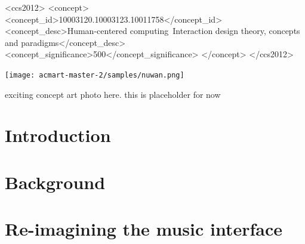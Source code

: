 \documentclass[acmtog]{acmart}
\begin{document}
\begin{CCSXML}
<ccs2012>
   <concept>
       <concept_id>10003120.10003123.10011758</concept_id>
       <concept_desc>Human-centered computing~Interaction design theory, concepts and paradigms</concept_desc>
       <concept_significance>500</concept_significance>
       </concept>
 </ccs2012>
\end{CCSXML}



\begin{teaserfigure}
  \texttt{[image: acmart-master-2/samples/nuwan.png]}
  \caption{exciting concept art photo here. this is placeholder for now}
  \label{fig:teaser}
\end{teaserfigure}
\maketitle

\section{Introduction}

\section{Background}

\section{Re-imagining the music interface}
\end{document}
